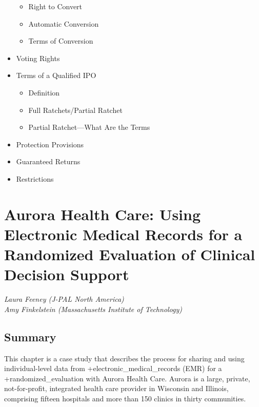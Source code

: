 \documentclass[
]{book}
\providecommand{\tightlist}{%
  \setlength{\itemsep}{0pt}\setlength{\parskip}{0pt}}
\begin{document}
\begin{itemize}
  \begin{itemize}
  \tightlist
  \item
    Right to Convert\\
  \item
    Automatic Conversion\\
  \item
    Terms of Conversion\\
  \end{itemize}
\item
  Voting Rights\\
\item
  Terms of a Qualified IPO

  \begin{itemize}
  \tightlist
  \item
    Definition\\
  \item
    Full Ratchets/Partial Ratchet\\
  \item
    Partial Ratchet---What Are the Terms\\
  \end{itemize}
\item
  Protection Provisions\\
\item
  Guaranteed Returns\\
\item
  Restrictions
\end{itemize}

\hypertarget{ahc}{%
\chapter{Aurora Health Care: Using Electronic Medical Records for a Randomized Evaluation of Clinical Decision Support}\label{ahc}}

\emph{Laura Feeney (J-PAL North America)}\\
\emph{Amy Finkelstein (Massachusetts Institute of Technology)}

\hypertarget{summary-5}{%
\section{Summary}\label{summary-5}}

This chapter is a case study that describes the process for sharing and using individual-level data from +electronic\_medical\_records\textbar{} (EMR) for a +randomized\_evaluation\textbar{} with Aurora Health Care. Aurora is a large, private, not-for-profit, integrated health care provider in Wisconsin and Illinois, comprising fifteen hospitals and more than 150 clinics in thirty communities.
\end{document}
